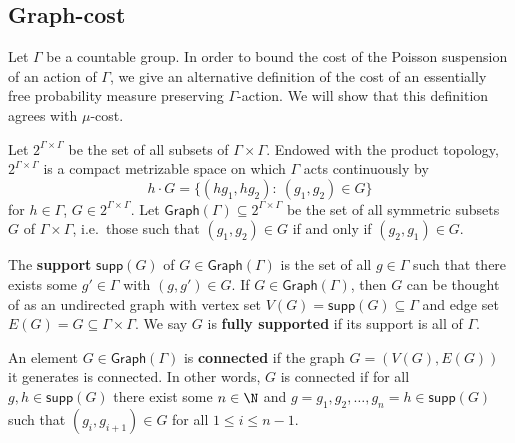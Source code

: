 \documentclass[12pt]{article}
\theoremstyle{plain}
\theoremstyle{definition}
\theoremstyle{remark}
\newcommand{\G}{\Gamma}
\newcommand\cost{{\operatorname{Cost}}}
\newcommand\Prob{\operatorname{Prob}}
\begin{document}



\subsection{Graph-cost}\label{S:cost-graph}



Let $\G$ be a countable group. In order to bound the cost of the Poisson suspension of an action of $\G$, we give an alternative definition of the cost of an essentially free probability measure preserving $\G$-action. We will show that this definition agrees with $\mu$-cost. 

Let $2^{\G\times \G}$ be the set of all subsets of  $\G\times \G$. Endowed with the product topology, $2^{\G\times \G}$ is a compact metrizable space on which $\G$ acts continuously by
$$h\cdot G=\{(h g_1,h g_2 ):~(g_1,g_2)\in G\}$$ for $h\in \G$, $G \in 2^{\G\times \G}$.
Let $\mathsf{Graph}(\G) \subseteq 2^{\G\times \G}$ be the set of all symmetric subsets $G$ of $\G\times \G$, i.e.\ those such that $(g_1,g_2) \in G$ if and only if $(g_2,g_1)\in G$.

The {\bf support} $\mathsf{supp}(G)$ of $G \in \mathsf{Graph}(\G)$ is the set of all $g\in \G$ such that there exists some $g' \in \G$ with $(g, g')\in G$. If $G \in \mathsf{Graph}(\G)$, then $G$ can be thought of as an undirected graph with vertex set $V(G) = \mathsf{supp}(G) \subseteq \Gamma$ and edge set $E(G) = G \subseteq \Gamma \times \Gamma$.
We say $G$ is {\bf fully supported} if its support is all of $\Gamma$.

An element $G \in \mathsf{Graph}(\G) $ is {\bf connected} if the graph $G = (V(G), E(G))$ it generates is connected. 
In other words, $G$ is connected if for all $g,h\in \mathsf{supp}(G)$ there exist some $n\in \N$ and $g=g_1, g_2, \dots, g_n=h \in \mathsf{supp}(G)$ such that
$(g_i,g_{i+1})\in G$ for all $1\leq i\leq n-1$.

\end{document}
